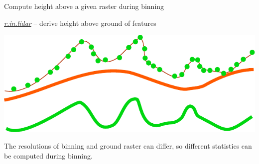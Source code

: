 \documentclass[xcolor={dvipsnames,usenames},beamer,aspectratio=1610]{beamer}
\newcommand{\gmodule}[1]{\href{http://grass.osgeo.org/grass71/manuals/#1.html}{\emph{#1}}}
\begin{document}
\begin{frame}{Compute height above a given raster during binning}

\gmodule{r.in.lidar} -- derive height above ground of features

\begin{center}
\includegraphics[height=0.5\textheight]{images/features/base_raster}
\end{center}

The resolutions of binning and ground raster can differ, so different
statistics can be computed during binning.

\end{frame}
\end{document}
